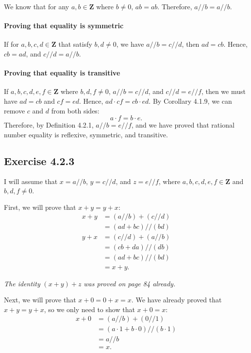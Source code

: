 \documentclass[12pt, oneside]{book}
\begin{document}
	We know that for any $a, b \in \mathbf{Z}$ where $b \ne 0$, $ab = ab$. Therefore, $a // b = a // b$.
	
	\paragraph*{Proving that equality is symmetric}
	
	If for $a, b, c, d \in \mathbf{Z}$ that satisfy $b, d \ne 0$, we have $a // b = c // d$, then $ad = cb$. Hence, $cb = ad$, and $c // d = a // b$.
	
	\paragraph*{Proving that equality is transitive}
	
	If $a, b, c, d, e, f \in \mathbf{Z}$ where $b, d, f \ne 0$, $a // b = c // d$, and $c // d = e // f$, then we must have $ad = cb$ and $cf = ed$. Hence, $ad \cdot cf = cb \cdot ed$. By Corollary 4.1.9, we can remove $c$ and $d$ from both sides:
	\[a \cdot f = b \cdot e.\]
	Therefore, by Definition 4.2.1, $a // b = e // f$, and we have proved that rational number equality is reflexive, symmetric, and transitive.
	
	\subsection*{Exercise 4.2.3}
	
	I will assume that $x = a // b$, $y = c // d$, and $z = e // f$, where $a, b, c, d, e, f \in \mathbf{Z}$ and $b, d, f \ne 0$.
	
	First, we will prove that $x + y = y + x$:
	\begin{align*}
		x + y &= (a // b) + (c // d) \\
		&= (ad + bc) // (bd) \\
		y + x &= (c // d) + (a // b) \\
		&= (cb + da) // (db) \\
		&= (ad + bc) // (bd) \\
		&= x + y.
	\end{align*}
	
	\emph{The identity} $(x + y) + z$ \emph{was proved on page 84 already.}
	
	Next, we will prove that $x + 0 = 0 + x = x$. We have already proved that $x + y = y + x$, so we only need to show that $x + 0 = x$:
	\[\begin{split}
		x + 0 &= (a // b) + (0 // 1) \\
		&= (a \cdot 1 + b \cdot 0) // (b \cdot 1) \\
		&= a // b \\
		&= x.
	\end{split}\]
	
\end{document}

